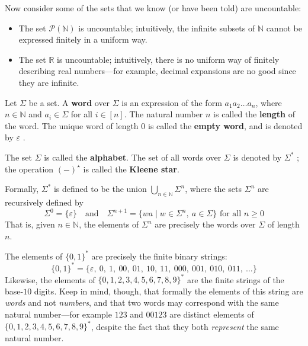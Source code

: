 Now consider some of the sets that we know (or have been told) are uncountable:
\begin{itemize}
\item The set $\mathcal{P}(\mathbb{N})$ is uncountable; intuitively, the infinite subsets of $\mathbb{N}$ cannot be expressed finitely in a uniform way.
\item The set $\mathbb{R}$ is uncountable; intuitively, there is no uniform way of finitely describing real numbers---for example, decimal expansions are no good since they are infinite.
\end{itemize}

\begin{definition}
\label{defKleeneStar}
Let $\Sigma$ be a set. A \textbf{word} over $\Sigma$ is an expression of the form $a_1 a_2 \dots a_n$, where $n \in \mathbb{N}$ and $a_i \in \Sigma$ for all $i \in [n]$. The natural number $n$ is called the \textbf{length} of the word. The unique word of length $0$ is called the \textbf{empty word}, and is denoted by $\varepsilon$ .

The set $\Sigma$ is called the \textbf{alphabet}. The set of all words over $\Sigma$ is denoted by $\Sigma^*$ ; the operation $(-)^{\star}$ is called the \textbf{Kleene star}.
\end{definition}

Formally, $\Sigma^*$ is defined to be the union $\displaystyle\bigcup_{n \in \mathbb{N}} \Sigma^n$, where the sets $\Sigma^n$ are recursively defined by
\[ \Sigma^0 = \{ \varepsilon \} \quad \text{and} \quad \Sigma^{n+1} = \{ wa \mid w \in \Sigma^n,~ a \in \Sigma \} \text{ for all } n \ge 0 \]
That is, given $n \in \mathbb{N}$, the elements of $\Sigma^n$ are precisely the words over $\Sigma$ of length $n$.

\begin{example}
\label{exSomeExamplesOfFiniteStrings}
The elements of $\{ 0,1 \}^*$ are precisely the finite binary strings:
\[ \{ 0,1 \}^* = \{ \varepsilon,~ 0,~ 1,~ 00,~ 01,~ 10,~ 11,~ 000,~ 001,~ 010,~ 011,~ \dots \} \]
Likewise, the elements of $\{ 0,1,2,3,4,5,6,7,8,9 \}^*$ are the finite strings of the base-$10$ digits. Keep in mind, though, that formally the elements of this string are \textit{words} and not \textit{numbers}, and that two words may correspond with the same natural number---for example $123$ and $00123$ are distinct elements of $\{ 0,1,2,3,4,5,6,7,8,9 \}^*$, despite the fact that they both \textit{represent} the same natural number.
\end{example}


